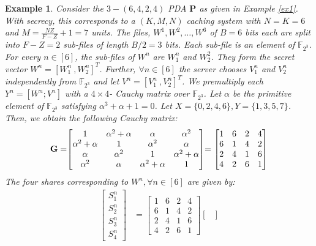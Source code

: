 \documentclass[conference]{IEEEtran}
\newtheorem{exmp}{Example}
\begin{document}
\begin{exmp}
	Consider the $3-(6,4,2,4)$ PDA $\mathbf{P}$ as given in Example \ref{ex1}.
	With secrecy, this corresponds to a $(K,M,N)$ caching system with $N=K=6$ and $M=\frac{NZ}{F-Z}+1=7$ units. The files, $W^1,W^2,\ldots,W^6$ of $B=6$ bits each are split into $F-Z=2$ sub-files of length $B/2=3$ bits. Each sub-file is an element of $\mathbb{F}_{2^3}$. For every $n\in [6]$, the sub-files of $W^n$ are $W^n_1$ and $W^2_2$. They form the secret vector $W^n=[W^n_1 \ , W^n_2]^T$. Further, $\forall n \in [6]$ the server chooses $V^n_1$ and $V^n_2$ independently from $\mathbb{F}_{2^3}$ and let $V^n=[V^n_1 \ ,  V^n_2]^T$. We premultiply each $Y^n=[W^n; V^n]$ with a $4\times 4$- Cauchy matrix over  $\mathbb{F}_{2^3}$. Let $\alpha$ be the primitive element of $\mathbb{F}_{2^3}$ satisfying $\alpha^3+\alpha+1=0$. Let $X=\{0,2,4,6\}, Y=\{1,3,5,7\}$. Then, we obtain the following Cauchy matrix:
	\begin{align*}
	\mathbf{G}=\hspace{-1mm}
	\begin{bmatrix}
	1 &  \alpha^2+\alpha & \alpha & \alpha^2\\
	\alpha^2+\alpha & 1 & \alpha^2 & \alpha\\
	\alpha & \alpha^2 & 1 & \alpha^2+\alpha\\
	\alpha^2 & \alpha & \alpha^2+\alpha & 1
	\end{bmatrix}
	\hspace{-1mm}=
	\begin{bmatrix}
	1 &  6 & 2 & 4\\
	6 & 1 & 4 & 2\\
	2 & 4 & 1 & 6\\
	4 & 2 & 6 & 1
	\end{bmatrix}
	\end{align*}
	The four shares corresponding to $W^n,\forall n\in[6]$ are given by:
	\begin{align}
	\begin{bmatrix}
	S^n_1\\S^n_2\\S^n_3\\S^n_4
	\end{bmatrix}
	&=
	\begin{bmatrix}
	1 &  6 & 2 & 4\\
	6 & 1 & 4 & 2\\
	2 & 4 & 1 & 6\\
	4 & 2 & 6 & 1
	\end{bmatrix}
	\begin{bmatrix}

\end{bmatrix}
\end{align}
\end{exmp}
\end{document}

